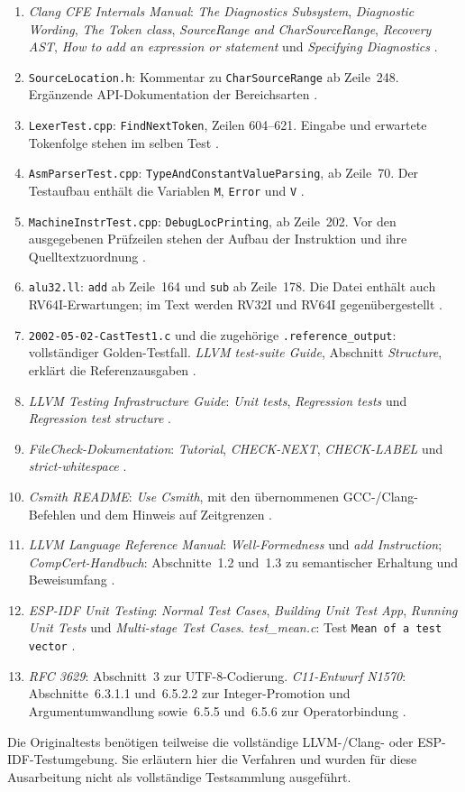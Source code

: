 \documentclass[11pt,a4paper]{article}
\newcommand{\code}[1]{\texttt{#1}}
\begin{document}
\begin{enumerate}
\item \emph{Clang CFE Internals Manual}: \emph{The Diagnostics Subsystem}, \emph{Diagnostic Wording}, \emph{The Token class}, \emph{SourceRange and CharSourceRange}, \emph{Recovery AST}, \emph{How to add an expression or statement} und \emph{Specifying Diagnostics} \parencite{clang}.
\item \code{SourceLocation.h}: Kommentar zu \code{CharSourceRange} ab Zeile~248. Ergänzende API-Dokumentation der Bereichsarten \parencite{sourcelocation}.
\item \code{LexerTest.cpp}: \code{FindNextToken}, Zeilen 604--621. Eingabe und erwartete Tokenfolge stehen im selben Test \parencite{lexertest}.
\item \code{AsmParserTest.cpp}: \code{TypeAndConstantValueParsing}, ab Zeile~70. Der Testaufbau enthält die Variablen \code{M}, \code{Error} und \code{V} \parencite{parsertest}.
\item \code{MachineInstrTest.cpp}: \code{DebugLocPrinting}, ab Zeile~202. Vor den ausgegebenen Prüfzeilen stehen der Aufbau der Instruktion und ihre Quelltextzuordnung \parencite{machineunit}.
\item \code{alu32.ll}: \code{add} ab Zeile~164 und \code{sub} ab Zeile~178. Die Datei enthält auch RV64I-Erwartungen; im Text werden RV32I und RV64I gegenübergestellt \parencite{rvtest}.
\item \code{2002-05-02-CastTest1.c} und die zugehörige \code{.reference\_output}: vollständiger Golden-Testfall. \emph{LLVM test-suite Guide}, Abschnitt \emph{Structure}, erklärt die Referenzausgaben \parencite{goldenc,suiteguide}.
\item \emph{LLVM Testing Infrastructure Guide}: \emph{Unit tests}, \emph{Regression tests} und \emph{Regression test structure} \parencite{testing}.
\item \emph{FileCheck-Dokumentation}: \emph{Tutorial}, \emph{CHECK-NEXT}, \emph{CHECK-LABEL} und \emph{strict-whitespace} \parencite{filecheck}.
\item \emph{Csmith README}: \emph{Use Csmith}, mit den übernommenen GCC-/Clang-Befehlen und dem Hinweis auf Zeitgrenzen \parencite{csmith}.
\item \emph{LLVM Language Reference Manual}: \emph{Well-Formedness} und \emph{add Instruction}; \emph{CompCert-Handbuch}: Abschnitte~1.2 und~1.3 zu semantischer Erhaltung und Beweisumfang \parencite{langref,compcert}.
\item \emph{ESP-IDF Unit Testing}: \emph{Normal Test Cases}, \emph{Building Unit Test App}, \emph{Running Unit Tests} und \emph{Multi-stage Test Cases}. \emph{test\_mean.c}: Test \code{Mean of a test vector} \parencite{esptests,espmean}.
\item \emph{RFC 3629}: Abschnitt~3 zur UTF-8-Codierung. \emph{C11-Entwurf N1570}: Abschnitte~6.3.1.1 und~6.5.2.2 zur Integer-Promotion und Argumentumwandlung sowie~6.5.5 und~6.5.6 zur Operatorbindung \parencite{utf8,wg14_n1570_2011}.
\end{enumerate}

Die Originaltests benötigen teilweise die vollständige LLVM-/Clang- oder
ESP-IDF-Testumgebung. Sie erläutern hier die Verfahren und wurden für
diese Ausarbeitung nicht als vollständige Testsammlung ausgeführt.

\clearpage
\printbibliography[heading=bibintoc,title={Literatur}]
\end{document}
